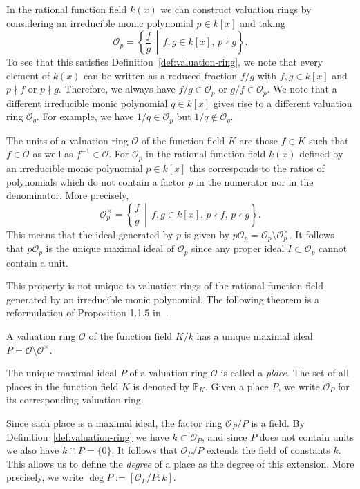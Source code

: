 In the rational function field \(k(x)\) we can construct valuation rings by considering an irreducible monic polynomial \(p \in k[x]\) and taking
\[\mathcal{O}_{p} = \left\{ \frac{f}{g} \,\middle|\, f,g \in k[x] ,\, p \nmid g \right\}.\]
To see that this satisfies Definition~\ref{def:valuation-ring}, we note that every element of \(k(x)\) can be written as a reduced fraction \(f/g\) with \(f,g \in k[x]\) and \(p \nmid f\) or \(p \nmid g\). Therefore, we always have \(f/g \in \mathcal{O}_{p}\) or \(g/f \in \mathcal{O}_{p}\). We note that a different irreducible monic polynomial \(q \in k[x]\) gives rise to a different valuation ring \(\mathcal{O}_{q}\). For example, we have \(1/q \in \mathcal{O}_{p}\) but \(1/q \notin \mathcal{O}_{q}\).

The units of a valuation ring \(\mathcal{O}\) of the function field \(K\) are those \(f \in K\) such that \(f \in \mathcal{O}\) as well as \(f^{-1} \in \mathcal{O}\). For \(\mathcal{O}_{p}\) in the rational function field \(k(x)\) defined by an irreducible monic polynomial \(p \in k[x]\) this corresponds to the ratios of polynomials which do not contain a factor \(p\) in the numerator nor in the denominator. More precisely,
\[\mathcal{O}_{p}^{\times} = \left\{ \frac{f}{g} \,\middle|\, f,g \in k[x] ,\, p \nmid f ,\, p \nmid g \right\}.\]
This means that the ideal generated by \(p\) is given by \(p\mathcal{O}_{p} = \mathcal{O}_{p} \setminus \mathcal{O}_{p}^{\times}\). It follows that \(p\mathcal{O}_{p}\) is the unique maximal ideal of \(\mathcal{O}_{p}\) since any proper ideal \(I \subset \mathcal{O}_{p}\) cannot contain a unit.

This property is not unique to valuation rings of the rational function field generated by an irreducible monic polynomial. The following theorem is a reformulation of Proposition 1.1.5 in~\cite{stichtenoth-2009-algebraic-function-fields}.

\begin{theorem}%
  \label{thm:place-is-maximal-ideal}
  A valuation ring \(\mathcal{O}\) of the function field \(K / k\) has a unique maximal ideal \(P = \mathcal{O} \setminus \mathcal{O}^{\times}\).
\end{theorem}

The unique maximal ideal \(P\) of a valuation ring \(\mathcal{O}\) is called a \textit{place}. The set of all places in the function field \(K\) is denoted by \(\mathbb{P}_{K}\). Given a place \(P\), we write \(\mathcal{O}_{P}\) for its corresponding valuation ring.

Since each place is a maximal ideal, the factor ring \(\mathcal{O}_{P} / P\) is a field. By Definition~\ref{def:valuation-ring} we have \(k \subset \mathcal{O}_{P}\), and since \(P\) does not contain units we also have \(k \cap P = \{0\}\). It follows that \(\mathcal{O}_{P} / P\) extends the field of constants \(k\). This allows us to define the \textit{degree} of a place as the degree of this extension. More precisely, we write \(\deg{P} := [\mathcal{O}_{P} / P : k]\).

